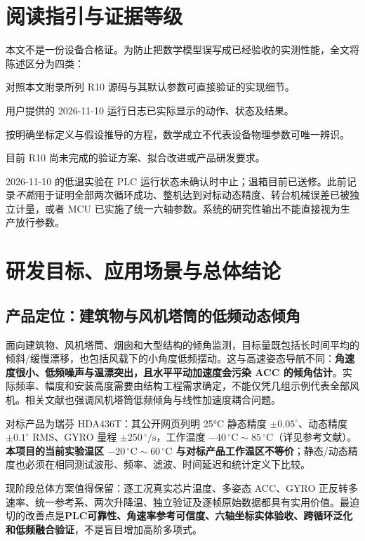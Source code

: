 \documentclass[UTF8,a4paper,11pt,oneside,openany,fontset=none]{ctexbook}
\newcommand{\degc}{\,^{\circ}\mathrm C}
\newcommand{\dps}{\,^{\circ}/\mathrm s}
\begin{document}
\chapter*{阅读指引与证据等级}
本文不是一份设备合格证。为防止把数学模型误写成已经验收的实测性能，全文将陈述区分为四类：
\begin{description}[leftmargin=3em,style=nextline]
\item[【源码事实】] 对照本文附录所列 R10 源码与其默认参数可直接验证的实现细节。
\item[【实验记录】] 用户提供的 2026-11-10 运行日志已实际显示的动作、状态及结果。
\item[【理论推导】] 按明确坐标定义与假设推导的方程，数学成立不代表设备物理参数可唯一辨识。
\item[【改进建议】] 目前 R10 尚未完成的验证方案、拟合改进或产品研发要求。
\end{description}
\begin{warningbox}
2026-11-10 的低温实验在 PLC 运行状态未确认时中止；温箱目前已送修。此前记录\emph{不能}用于证明全部两次循环成功、整机达到对标动态精度、转台机械误差已被独立计量，或者 MCU 已实施了统一六轴参数。系统的研究性输出不能直接视为生产放行参数。
\end{warningbox}
\tableofcontents
\mainmatter

\chapter{研发目标、应用场景与总体结论}
\section{产品定位：建筑物与风机塔筒的低频动态倾角}
面向建筑物、风机塔筒、烟囱和大型结构的倾角监测，目标量既包括长时间平均的倾斜/缓慢漂移，也包括风载下的小角度低频摆动。这与高速姿态导航不同：\textbf{角速度很小、低频噪声与温漂突出，且水平平动加速度会污染 ACC 的倾角估计}。实际频率、幅度和安装高度需要由结构工程需求确定，不能仅凭几组示例代表全部风机。相关文献也强调风机塔筒低频倾角与线性加速度耦合问题\cite{TOWER,ADI}。

对标产品为瑞芬 HDA436T：其公开网页列明 25°C 静态精度 $\pm0.05^\circ$、动态精度 $\pm0.1^\circ$ RMS、GYRO 量程 $\pm250\dps$，工作温度 $-40\degc\sim85\degc$（详见参考文献\cite{RION,RION2}）。\textbf{本项目的当前实验温区 $-20\degc\sim60\degc$ 与对标产品工作温区不等价}；静态/动态精度也必须在相同测试波形、频率、滤波、时间延迟和统计定义下比较。

\begin{keypoint}
现阶段总体方案值得保留：逐工况真实芯片温度、多姿态 ACC、GYRO 正反转多速率、统一参考系、两次升降温、独立验证及逐帧原始数据都具有实用价值。最迫切的改善点是\textbf{PLC可靠性、角速率参考可信度、六轴坐标实体验收、跨循环泛化和低频融合验证}，不是盲目增加高阶多项式。
\end{keypoint}
\end{document}
